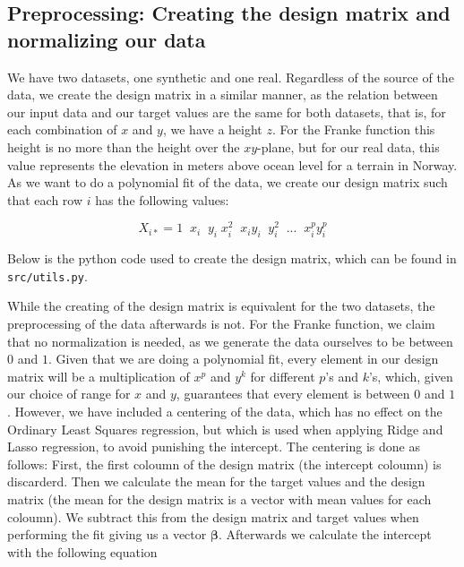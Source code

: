 \documentclass[twocolumn,10pt,cleanfoot]{asme2ej}
\begin{document}
\subsection{Preprocessing: Creating the design matrix and normalizing our data}
We have two datasets, one synthetic and one real. Regardless of the source of the data, we create the design matrix in a similar manner, as the relation between our input data and our target values are the same for both datasets, that is, for each combination of $x$ and $y$, we have a height $z$. For the Franke function this height is no more than the height over the $xy$-plane, but for our real data, this value represents the elevation in meters above ocean level for a terrain in Norway. As we want to do a polynomial fit of the data, we create our design matrix such that each row $i$ has the following values:

\begin{equation}
X_{i*} = 1 \;\; x_i \;\; y_i \; x_i^2 \;\; x_i y_i \;\; y_i^2 \;\; ... \;\; x_i^p y_i^p
\end{equation}

	Below is the python code used to create the design matrix, which can be found in \texttt{src/utils.py}.



	While the creating of the design matrix is equivalent for the two datasets, the preprocessing of the data afterwards is not. For the Franke function, we claim that no normalization is needed, as we generate the data ourselves to be between $0$ and $1$. Given that we are doing a polynomial fit, every element in our design matrix will be a multiplication of $x^p$ and $y^k$ for different $p$'s and $k$'s, which, given our choice of range for $x$ and $y$, guarantees that every element is between $0$ and $1$. However, we have included a centering of the data, which has no effect on the Ordinary Least Squares regression, but which is used when applying Ridge and Lasso regression, to avoid punishing the intercept. The centering is done as follows: First, the first coloumn of the design matrix (the intercept coloumn) is discarderd. Then we calculate the mean for the target values and the design matrix (the mean for the design matrix is a vector with mean values for each coloumn). We subtract this from the design matrix and target values when performing the fit giving us a vector $\bm{\beta}$. Afterwards we calculate the intercept with the following equation
\end{document}
